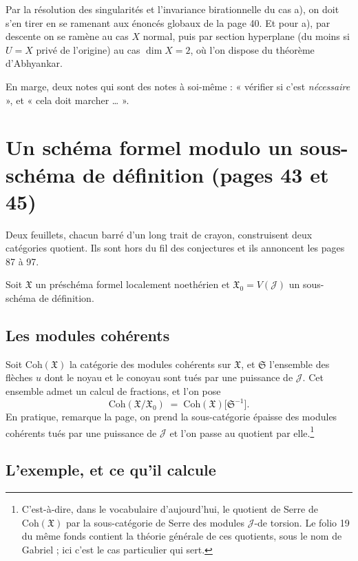 \documentclass[11pt,a4paper]{article}
\begin{document}
Par la résolution des singularités et l'invariance birationnelle du cas a), on
doit s'en tirer en se ramenant aux énoncés globaux de la page 40. Et pour a),
par descente on se ramène au cas $X$ normal, puis par section hyperplane
(du moins si $U = X$ privé de l'origine) au cas $\dim X = 2$, où l'on dispose
du théorème d'Abhyankar.

En marge, deux notes qui sont des notes à soi-même : « vérifier si c'est
\emph{nécessaire} », et « cela doit marcher … ».

\section*{Un schéma formel modulo un sous-schéma de définition (pages 43 et 45)}

Deux feuillets, chacun barré d'un long trait de crayon, construisent deux
catégories quotient. Ils sont hors du fil des conjectures et ils annoncent les
pages 87 à 97.

Soit $\mathfrak{X}$ un préschéma formel localement noethérien et
$\mathfrak{X}_{0} = V(\mathcal{J})$ un sous-schéma de définition.

\subsection*{Les modules cohérents}

Soit $\mathrm{Coh}(\mathfrak{X})$ la catégorie des modules cohérents sur
$\mathfrak{X}$, et $\mathfrak{S}$ l'ensemble des flèches $u$ dont le noyau et
le conoyau sont tués par une puissance de $\mathcal{J}$. Cet ensemble admet un
calcul de fractions, et l'on pose
\[
  \mathrm{Coh}(\mathfrak{X}/\mathfrak{X}_{0}) \;=\;
  \mathrm{Coh}(\mathfrak{X})\bigl[\mathfrak{S}^{-1}\bigr] .
\]
En pratique, remarque la page, on prend la sous-catégorie
épaisse des modules cohérents tués par une puissance de $\mathcal{J}$ et l'on
passe au quotient par elle.\footnote{C'est-à-dire, dans le vocabulaire
d'aujourd'hui, le quotient de Serre de $\mathrm{Coh}(\mathfrak{X})$ par la
sous-catégorie de Serre des modules $\mathcal{J}$-de torsion. Le folio 19 du
même fonds contient la théorie générale de ces quotients, sous le nom de
Gabriel ; ici c'est le cas particulier qui sert.}

\subsection*{L'exemple, et ce qu'il calcule}
\end{document}

